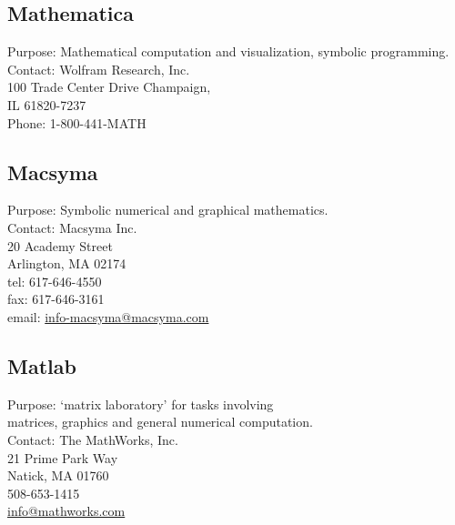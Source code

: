 \subsection{Mathematica}
        Purpose: Mathematical computation and visualization,
        symbolic programming.\\
        Contact: Wolfram Research, Inc.\\
        100 Trade Center Drive Champaign,\\
        IL 61820-7237\\
        Phone: 1-800-441-MATH

\subsection{Macsyma}
        Purpose: Symbolic numerical and graphical mathematics.\\
        Contact: Macsyma Inc.\\
        20 Academy Street\\
        Arlington, MA 02174\\
        tel: 617-646-4550\\
        fax: 617-646-3161\\
        email: \url{info-macsyma@macsyma.com}

\subsection{Matlab}
        Purpose: `matrix laboratory' for tasks involving\\
        matrices, graphics and general numerical computation.\\
        Contact: The MathWorks, Inc.\\
        21 Prime Park Way\\
        Natick, MA 01760\\
        508-653-1415\\
        \url{info@mathworks.com}

